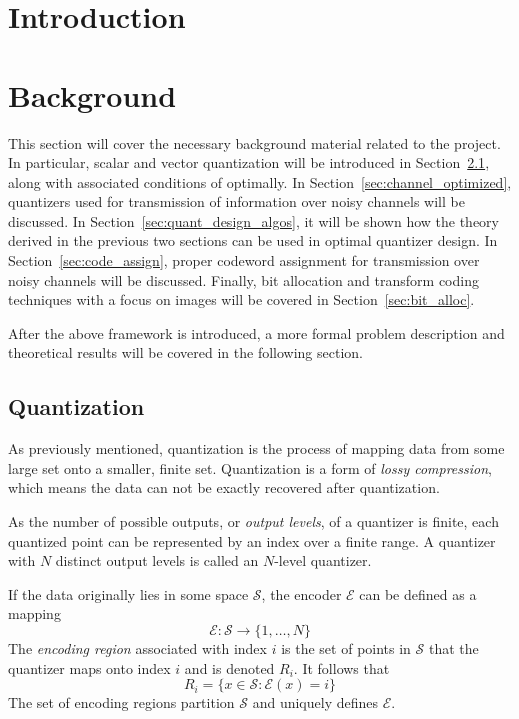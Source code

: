 \documentclass[10pt]{article}
\begin{document}
\section{Introduction}

\section{Background}
This section will cover the necessary background material related to the project. In particular, scalar and vector quantization will be introduced in Section~\ref{sec:quantization}, along with associated conditions of optimally. In Section~\ref{sec:channel_optimized}, quantizers used for transmission of information over noisy channels will be discussed. In Section~\ref{sec:quant_design_algos}, it will be shown how the theory derived in the previous two sections can be used in optimal quantizer design. In Section~\ref{sec:code_assign}, proper codeword assignment for transmission over noisy channels will be discussed. Finally, bit allocation and transform coding techniques with a focus on images will be covered in Section~\ref{sec:bit_alloc}.

After the above framework is introduced, a more formal problem description and theoretical results will be covered in the following section.
\subsection{Quantization}
\label{sec:quantization}
As previously mentioned, quantization is the process of mapping data from some large set onto a smaller, finite set. Quantization is a form of \emph{lossy compression}, which means the data can not be exactly recovered after quantization.

As the number of possible outputs, or \emph{output levels}, of a quantizer is finite, each quantized point can be represented by an index over a finite range. A quantizer with $N$ distinct output levels is called an $N$-level quantizer. 

If the data originally lies in some space $\mathcal{S}$, the encoder $\mathcal{E}$ can be defined as a mapping
\begin{equation}
\mathcal{E} : \mathcal{S} \rightarrow \{1,\ldots,N\}
\end{equation}
The \emph{encoding region} associated with index $i$ is the set of points in $\mathcal{S}$ that the quantizer maps onto index $i$ and is denoted $R_i$. It follows that
\begin{equation}
R_i = \{x \in \mathcal{S} : \mathcal{E}(x) = i\}
\end{equation}
The set of encoding regions partition $\mathcal{S}$ and uniquely defines $\mathcal{E}$.
\end{document}
